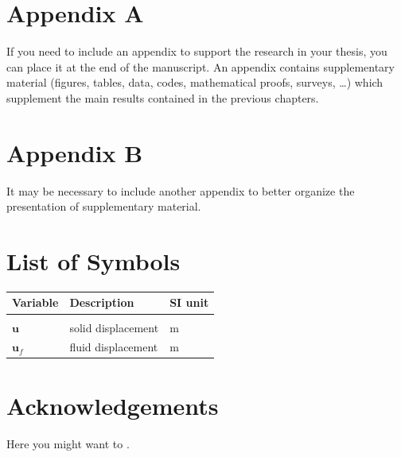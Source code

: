 \documentclass{Configuration_Files/PoliMi3i_thesis}
\begin{document}
\chapter{Appendix A}
If you need to include an appendix to support the research in your thesis, you can place it at the end of the manuscript.
An appendix contains supplementary material (figures, tables, data, codes, mathematical proofs, surveys, \dots)
which supplement the main results contained in the previous chapters.

\chapter{Appendix B}
It may be necessary to include another appendix to better organize the presentation of supplementary material.


\listoffigures

\listoftables

\chapter*{List of Symbols} %
\begin{table}[H]
    \centering
    \begin{tabular}{lll}
        \textbf{Variable} & \textbf{Description} & \textbf{SI unit} \\\hline\\[-9px]
        $\bm{u}$ & solid displacement & m \\[2px]
        $\bm{u}_f$ & fluid displacement & m \\[2px]
    \end{tabular}
\end{table}

\chapter*{Acknowledgements}
Here you might want to .


\cleardoublepage
\end{document}
